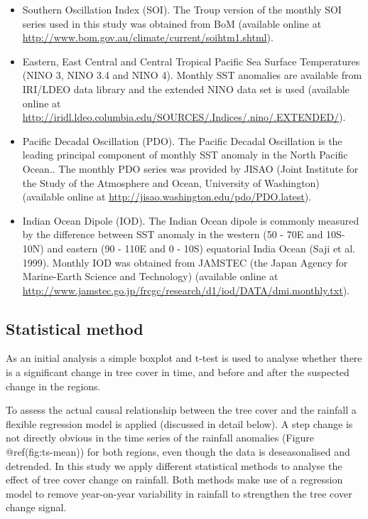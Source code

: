 \documentclass[fleqn,10pt,lineno]{wlpeerj} %
\providecommand{\tightlist}{
\setlength{\itemsep}{0pt}\setlength{\parskip}{0pt}}
\begin{document}
\begin{itemize}
\tightlist
\item
  Southern Oscillation Index (SOI). The Troup version of the monthly SOI
  series used in this study was obtained from BoM (available online at
  \url{http://www.bom.gov.au/climate/current/soihtm1.shtml}).\\
\item
  Eastern, East Central and Central Tropical Pacific Sea Surface
  Temperatures (NINO 3, NINO 3.4 and NINO 4). Monthly SST anomalies are
  available from IRI/LDEO data library and the extended NINO data set is
  used (available online at
  \url{http://iridl.ldeo.columbia.edu/SOURCES/.Indices/.nino/.EXTENDED/}).\\
\item
  Pacific Decadal Oscillation (PDO). The Pacific Decadal Oscillation is
  the leading principal component of monthly SST anomaly in the North
  Pacific Ocean.. The monthly PDO series was provided by JISAO (Joint
  Institute for the Study of the Atmosphere and Ocean, University of
  Washington) (available online at
  \url{http://jisao.washington.edu/pdo/PDO.latest}).\\
\item
  Indian Ocean Dipole (IOD). The Indian Ocean dipole is commonly
  measured by the difference between SST anomaly in the western (50 -
  70\textdegree E and 10\textdegree S-10\textdegree N) and eastern (90 -
  110\textdegree E and 0 - 10\textdegree S) equatorial India Ocean (Saji
  et al. 1999). Monthly IOD was obtained from JAMSTEC (the Japan Agency
  for Marine-Earth Science and Technology) (available online at
  \url{http://www.jamstec.go.jp/frcgc/research/d1/iod/DATA/dmi.monthly.txt}).
\end{itemize}

\subsection{Statistical method}\label{statistical-method}

As an initial analysis a simple boxplot and t-test is used to analyse
whether there is a significant change in tree cover in time, and before
and after the suspected change in the regions.

To assess the actual causal relationship between the tree cover and the
rainfall a flexible regression model is applied (discussed in detail
below). A step change is not directly obvious in the time series of the
rainfall anomalies (Figure @ref(fig:ts-mean)) for both regions, even
though the data is deseasonalised and detrended. In this study we apply
different statistical methods to analyse the effect of tree cover change
on rainfall. Both methods make use of a regression model to remove
year-on-year variability in rainfall to strengthen the tree cover change
signal.
\end{document}

